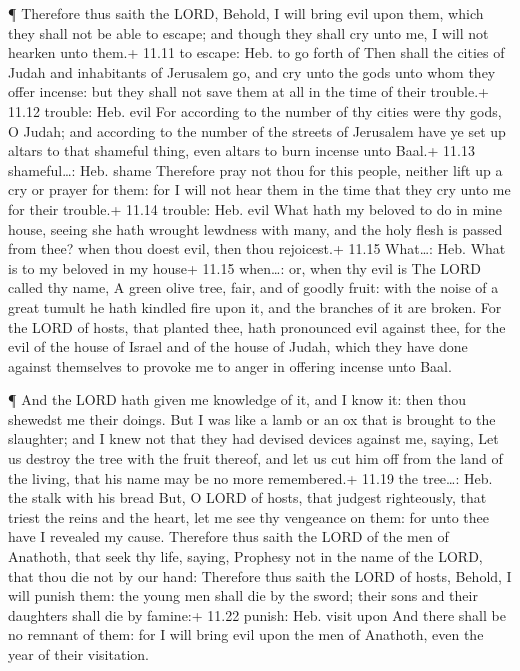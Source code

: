  ¶ Therefore thus saith the LORD, Behold, I will bring evil
upon them, which they shall not be able to escape; and though they shall
cry unto me, I will not hearken unto them.+ 11.11 to escape: Heb. to go
forth of  Then shall the cities of Judah and inhabitants of
Jerusalem go, and cry unto the gods unto whom they offer incense: but
they shall not save them at all in the time of their trouble.+ 11.12
trouble: Heb. evil  For according to the number of thy
cities were thy gods, O Judah; and according to the number of the
streets of Jerusalem have ye set up altars to that shameful thing, even
altars to burn incense unto Baal.+ 11.13 shameful\ldots: Heb. shame
 Therefore pray not thou for this people, neither lift up a
cry or prayer for them: for I will not hear them in the time that they
cry unto me for their trouble.+ 11.14 trouble: Heb. evil 
What hath my beloved to do in mine house, seeing she hath wrought
lewdness with many, and the holy flesh is passed from thee? when thou
doest evil, then thou rejoicest.+ 11.15 What\ldots: Heb. What is to my
beloved in my house+ 11.15 when\ldots: or, when thy evil is
 The LORD called thy name, A green olive tree, fair, and of
goodly fruit: with the noise of a great tumult he hath kindled fire upon
it, and the branches of it are broken.  For the LORD of
hosts, that planted thee, hath pronounced evil against thee, for the
evil of the house of Israel and of the house of Judah, which they have
done against themselves to provoke me to anger in offering incense unto
Baal.

 ¶ And the LORD hath given me knowledge of it, and I know
it: then thou shewedst me their doings.  But I was like a
lamb or an ox that is brought to the slaughter; and I knew not that they
had devised devices against me, saying, Let us destroy the tree with the
fruit thereof, and let us cut him off from the land of the living, that
his name may be no more remembered.+ 11.19 the tree\ldots: Heb. the
stalk with his bread  But, O LORD of hosts, that judgest
righteously, that triest the reins and the heart, let me see thy
vengeance on them: for unto thee have I revealed my cause. 
Therefore thus saith the LORD of the men of Anathoth, that seek thy
life, saying, Prophesy not in the name of the LORD, that thou die not by
our hand:  Therefore thus saith the LORD of hosts, Behold,
I will punish them: the young men shall die by the sword; their sons and
their daughters shall die by famine:+ 11.22 punish: Heb. visit upon
 And there shall be no remnant of them: for I will bring
evil upon the men of Anathoth, even the year of their visitation.

